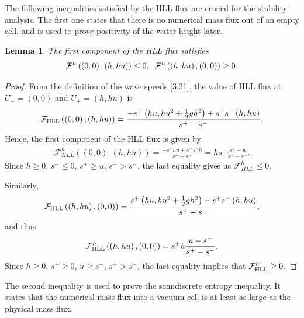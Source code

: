 \documentclass[11pt,a4paper,center,notitlepage]{article}
\numberwithin{equation}{section}
\newtheorem{lemma}{Lemma}
\begin{document}
The following inequalities satisfied by the HLL flux are crucial for the stability analysis. The first one states that there is no numerical mass flux out of an empty cell, and is used to prove positivity of the water height later.

\begin{lemma}
The first component of the HLL flux satisfies 
\begin{align}
\label{3.22}
{\mathcal{F}^h}\left( {\left( {0,0} \right),\left( {h,hu} \right)} \right) \le 0, \hspace{2mm} {\mathcal{F}^h}\left( {\left( {h,hu} \right),\left( {0,0} \right)} \right) \ge 0.
\end{align}
\end{lemma}

\begin{proof}
From the definition of the wave speeds \eqref{3.21}, the value of HLL flux at $U_-=\left(0,0\right)$ and $U_+ = \left(h,hu\right)$ is 
\begin{align}
{\mathcal{F}_{\rm HLL}}\left( {\left( {0,0} \right),\left( {h,hu} \right)} \right) = \frac{{ - {s^ - }\left( {hu,h{u^2} + \frac{1}{2}g{h^2}} \right) + {s^ + }{s^ - }\left( {h,hu} \right)}}{{{s^ + } - {s^ - }}}.
\end{align}
Hence, the first component of the HLL flux is given by 
\begin{align}
\mathcal{F}_{HLL}^h\left( {\left( {0,0} \right),\left( {h,hu} \right)} \right) = \frac{{ - {s^ - }hu + {s^ + }{s^ - }h}}{{{s^ + } - {s^ - }}} = h{s^ - }\frac{{{s^ + } - u}}{{{s^ + } - {s^ - }}}.
\end{align}
Since $h\ge 0$, $s^-\le 0$, $s^+ \ge u$, $s^+ >s^-$, the last equality gives us $\mathcal{F}_{HLL}^h \le 0$. 

Similarly,
\begin{align}
{\mathcal{F}_{\rm HLL}}\left( {\left( {h,hu} \right),\left( {0,0} \right)} \right) = \frac{{{s^ + }\left( {hu,h{u^2} + \frac{1}{2}g{h^2}} \right) - {s^ + }{s^ - }\left( {h,hu} \right)}}{{{s^ + } - {s^ - }}},
\end{align}
and thus
\begin{align}
\mathcal{F}_{\rm HLL}^h\left( {\left( {h,hu} \right),\left( {0,0} \right)} \right) = {s^ + }h\frac{{u - {s^ - }}}{{{s^ + } - {s^ - }}}.
\end{align}
Since $h\ge 0$, $s^+\ge 0$, $u\ge s^-$, $s^+ > s^-$, the last equality implies that $\mathcal{F}_{\rm HLL}^h \ge 0$. 
\end{proof}
The second inequality is used to prove the semidiscrete entropy inequality. It states that the numerical mass flux into a vacuum cell is at least as large as the physical mass flux. 
\end{document}
